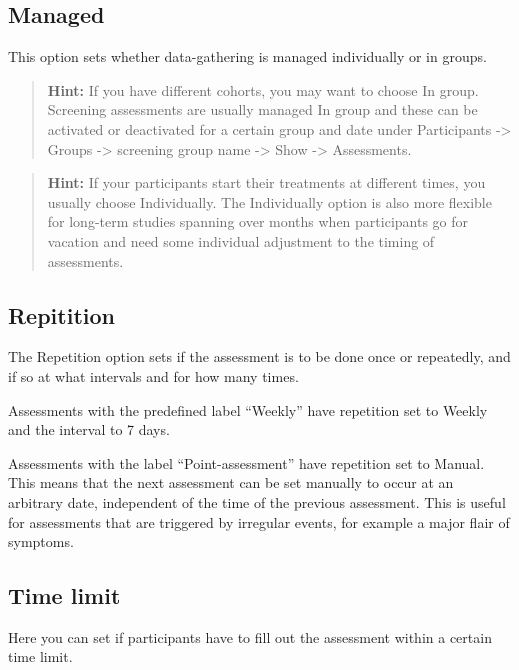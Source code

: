 \documentclass[]{book}
\begin{document}
\hypertarget{managed}{%
\subsection{Managed}\label{managed}}

This option sets whether data-gathering is managed individually or in groups.

\begin{quote}
\textbf{Hint:} If you have different cohorts, you may want to choose In group. Screening assessments are usually managed In group and these can be activated or deactivated for a certain group and date under Participants -\textgreater{} Groups -\textgreater{} screening group name -\textgreater{} Show -\textgreater{} Assessments.
\end{quote}

\begin{quote}
\textbf{Hint:} If your participants start their treatments at different times, you usually choose Individually. The Individually option is also more flexible for long-term studies spanning over months when participants go for vacation and need some individual adjustment to the timing of assessments.
\end{quote}

\hypertarget{repitition}{%
\subsection{Repitition}\label{repitition}}

The Repetition option sets if the assessment is to be done once or repeatedly, and if so at what intervals and for how many times.

Assessments with the predefined label ``Weekly'' have repetition set to Weekly and the interval to 7 days.

Assessments with the label ``Point-assessment'' have repetition set to Manual. This means that the next assessment can be set manually to occur at an arbitrary date, independent of the time of the previous assessment. This is useful for assessments that are triggered by irregular events, for example a major flair of symptoms.

\hypertarget{time-limit}{%
\subsection{Time limit}\label{time-limit}}

Here you can set if participants have to fill out the assessment within a certain time limit.
\end{document}
